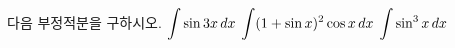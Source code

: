 다음 부정적분을 구하시오.
 $\displaystyle\int\sin 3x\mkern3mu dx$
 $\displaystyle\int(1+\sin x)^2\cos x\mkern3mu dx$
 $\displaystyle\int\sin^3 x\mkern3mu dx$
